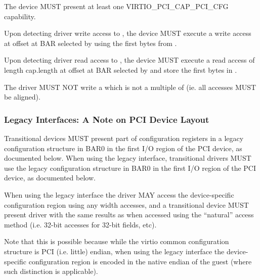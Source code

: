 The device MUST present at least one VIRTIO_PCI_CAP_PCI_CFG capability.

Upon detecting driver write access
to , the device MUST execute a write access
at offset  at BAR selected by  using the first 
bytes from .

Upon detecting driver read access
to , the device MUST
execute a read access of length cap.length at offset 
at BAR selected by  and store the first  bytes in
.


The driver MUST NOT write a  which is not
a multiple of  (ie. all accesses MUST be aligned).

\subsubsection{Legacy Interfaces: A Note on PCI Device Layout}\label{sec:Virtio Transport Options / Virtio Over PCI Bus / PCI Device Layout / Legacy Interfaces: A Note on PCI Device Layout}

Transitional devices MUST present part of configuration
registers in a legacy configuration structure in BAR0 in the first I/O
region of the PCI device, as documented below.
When using the legacy interface, transitional drivers
MUST use the legacy configuration structure in BAR0 in the first
I/O region of the PCI device, as documented below.

When using the legacy interface the driver MAY access
the device-specific configuration region using any width accesses, and
a transitional device MUST present driver with the same results as
when accessed using the ``natural'' access method (i.e.
32-bit accesses for 32-bit fields, etc).

Note that this is possible because while the virtio common configuration structure is PCI
(i.e. little) endian, when using the legacy interface the device-specific
configuration region is encoded in the native endian of the guest (where such distinction is
applicable).

